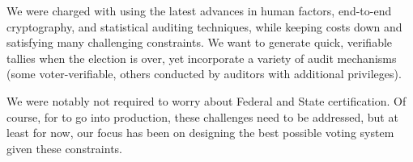 We were charged with using the latest advances in human factors,
end-to-end cryptography, and statistical auditing techniques, while
keeping costs down and satisfying many challenging constraints.
We want to generate quick, verifiable tallies when the election is
over, yet incorporate a variety of audit mechanisms (some
voter-verifiable, others conducted by auditors with additional
privileges). 

We were notably not required to worry about Federal and State
certification. Of course, for \projname to go into production, these
challenges need to be addressed, but at least for now, our focus
has been on designing the best possible voting system given these
constraints.

